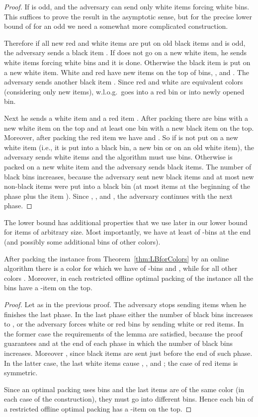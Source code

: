 \documentclass[11pt,a4paper]{article}
\begin{document}
\begin{proof}
If  is odd,  and the adversary
can send only  white items forcing  white bins.
This suffices to prove the result in the asymptotic sense,
but for the precise lower bound of 
for an odd  we need a somewhat more complicated construction.

Therefore if all new red and white items are put on old black items and
 is odd, the adversary sends a black item .
If  does not go on a new white item, he sends  white items
forcing  white bins and it is done.
Otherwise the black item  is put on a new white item.
White and red have  new items on the top of bins,
, and . 
The adversary sends another black item .
Since red and white are equivalent colors (considering only new items),
w.l.o.g.\  goes into a red bin or into newly opened bin.

Next he sends a white item  and a red item .
After packing  there are  bins with a new
white item on the top and at least one bin with a new black item on the top.
Moreover, after packing the red item  we have
 and .
So if  is not put on a new white item (i.e., it is put into a black
bin, a new bin or on an old white item), the adversary sends  white items
and the algorithm must use  bins.
Otherwise  is packed on a new white item and the adversary sends  black items.
The number of black bins increases, because the adversary sent  new black
items and at most  new non-black items were put into a black bin
(at most  items at the beginning of the phase plus the item ).
Since , , and
,
the adversary continues with the next phase.
\end{proof}

The lower bound has additional properties that we use later in our lower
bound for items of arbitrary size. Most importantly, we have at least
 of -bins at the end (and
possibly some additional bins of other colors).

\begin{lemma} \label{l:LBforColorsInstance}
After packing the instance from Theorem~\ref{thm:LBforColors} by an online algorithm
there is a color 
for which we have  of -bins and ,
while  for all other colors .
Moreover, in each restricted offline optimal packing of the instance all the bins have a -item on the top.
\end{lemma}

\begin{proof}
Let  as in the previous proof. 
The adversary stops sending items when he finishes the last phase. In the last phase either
the number of black bins increases to , or the adversary forces 
white or red bins by sending  white or red items. In the former case the requirements
of the lemma are satisfied, because the proof guarantees  and 
at the end of each phase in which the number of black bins increases. Moreover ,
since  black items are sent just before the end of such phase.
In the latter case, the last  white items cause , , and
; the case of  red items is symmetric.

Since an optimal packing uses  bins and the last  items are of the same color (in each case of the construction), 
they must go into different bins. Hence each bin of a restricted offline optimal packing has a -item on the top.
\end{proof}
\end{document}
